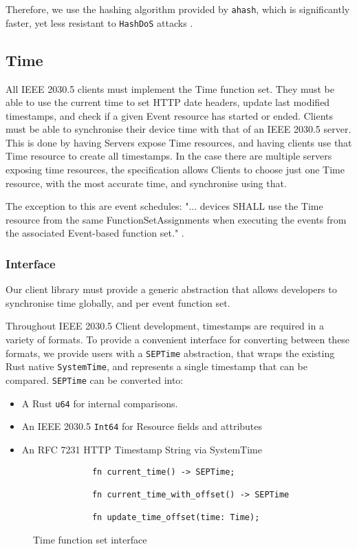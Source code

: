 Therefore, we use the hashing algorithm provided by \texttt{ahash}, which is significantly faster, yet less resistant to \texttt{HashDoS} attacks \cite{ahash} \cite{hashbrown}.

\subsection{Time}
All IEEE 2030.5 clients must implement the Time function set. They must be able to use the current time to set HTTP date headers, update last modified timestamps, and check if a given Event resource has started or ended. Clients must be able to synchronise their device time with that of an IEEE 2030.5 server. This is done by having Servers expose Time resources, and having clients use that Time resource to create all timestamps. In the case there are multiple servers exposing time resources, the specification allows Clients to choose just one Time resource, with the most accurate time, and synchronise using that.

The exception to this are event schedules: "... devices SHALL use the Time resource from the same FunctionSetAssignments when executing the events from the associated Event-based function set." \cite{IEEE2030.5}.

\subsubsection{Interface}
Our client library must provide a generic abstraction that allows developers to synchronise time globally, and per event function set.

Throughout IEEE 2030.5 Client development, timestamps are required in a variety of formats. To provide a convenient interface for converting between these formats, we provide users with a \texttt{SEPTime} abstraction, that wraps the existing Rust native \texttt{SystemTime}, and represents a single timestamp that can be compared. \texttt{SEPTime} can be converted into:

\begin{itemize}
    \item A Rust \texttt{u64} for internal comparisons.
    \item An IEEE 2030.5 \texttt{Int64} for Resource fields and attributes
    \item An RFC 7231 HTTP Timestamp String via SystemTime
\end{itemize} 


\begin{figure}[h]
    \begin{center}
        \begin{lstlisting}
            fn current_time() -> SEPTime;
            
            fn current_time_with_offset() -> SEPTime
            
            fn update_time_offset(time: Time);
        \end{lstlisting}
        \label{fig:timeinterface}
        \vspace{-10pt}
        \caption{Time function set interface}
    \end{center}
\end{figure}

